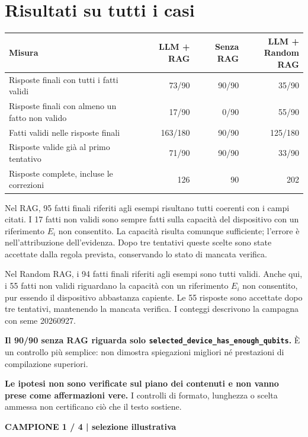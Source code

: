 \documentclass[a4paper,10pt]{article}
\newcommand{\tagline}[1]{{\small\color{ink}\textbf{#1}}\par}
\begin{document}
\section*{Risultati su tutti i casi}

\begingroup\small
\begin{tabularx}{\linewidth}{Xrrr}\toprule
Misura & LLM + RAG & Senza RAG & \shortstack{LLM +\\Random RAG}\\\midrule
Risposte finali con tutti i fatti validi & 73/90 & 90/90 & 35/90\\
Risposte finali con almeno un fatto non valido & 17/90 & 0/90 & 55/90\\
Fatti validi nelle risposte finali & 163/180 & 90/90 & 125/180\\
Risposte valide già al primo tentativo & 71/90 & 90/90 & 33/90\\
Risposte complete, incluse le correzioni & 126 & 90 & 202\\
\bottomrule\end{tabularx}\par\endgroup
Nel RAG, 95 fatti finali riferiti agli esempi risultano tutti coerenti con i campi citati. I 17 fatti non validi sono sempre fatti sulla capacità del dispositivo con un riferimento $E_i$ non consentito. La capacità risulta comunque sufficiente; l'errore è nell'attribuzione dell'evidenza. Dopo tre tentativi queste scelte sono state accettate dalla regola prevista, conservando lo stato di mancata verifica.\par
Nel Random RAG, i 94 fatti finali riferiti agli esempi sono tutti validi. Anche qui, i 55 fatti non validi riguardano la capacità con un riferimento $E_i$ non consentito, pur essendo il dispositivo abbastanza capiente. Le 55 risposte sono accettate dopo tre tentativi, mantenendo la mancata verifica. I conteggi descrivono la campagna con seme 20260927.\par
\textbf{Il 90/90 senza RAG riguarda solo \texttt{selected\_device\_has\_enough\_qubits}.} È un controllo più semplice: non dimostra spiegazioni migliori né prestazioni di compilazione superiori.\par
\textbf{Le ipotesi non sono verificate sul piano dei contenuti e non vanno prese come affermazioni vere.} I controlli di formato, lunghezza o scelta ammessa non certificano ciò che il testo sostiene.\par
\newpage
\tagline{CAMPIONE 1 / 4 | selezione illustrativa}
\end{document}
